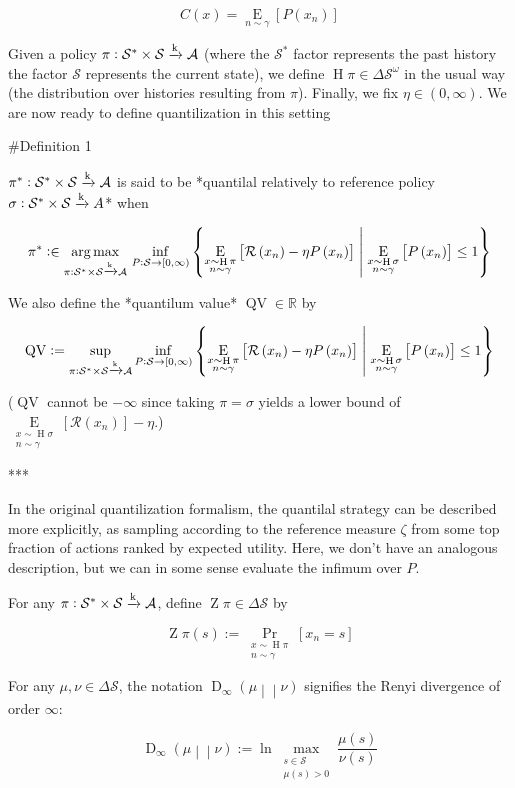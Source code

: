 \documentclass[a4paper]{article}
\newcommand{\AP}[1]{\left(#1\right)}
\newcommand{\AB}[1]{\left[#1\right]}
\newcommand{\ACM}[2]{\left\{#1\;\middle\vert\;#2\right\}}
\newcommand{\Pa}[2]{\underset{#1}{\operatorname{Pr}}\AB{#2}}
\newcommand{\Ea}[2]{\underset{#1}{\operatorname{E}}\AB{#2}}
\newcommand{\RD}[3]{\operatorname{D}_{#1}\AP{#2\middle\vert\middle\vert#3}}
\newcommand{\Argmax}[1]{\underset{#1}{\operatorname{arg\,max}}\,}
\newcommand{\Reals}{\mathbb{R}}
\newcommand{\K}{\xrightarrow{\textnormal{k}}}
\newcommand{\A}{\mathcal{A}}
\newcommand{\St}{\mathcal{S}}
\newcommand{\R}{\mathcal{R}}
\newcommand{\Pe}{P}
\newcommand{\Co}{C}
\newcommand{\QV}{\operatorname{QV}}
\DeclareMathOperator{\Hi}{H}
\DeclareMathOperator{\Z}{Z}
\begin{document}
$$\Co(x) = \Ea{n\sim\gamma}{\Pe\AP{x_n}}$$

Given a policy $\pi: \St^*\times\St \K \A$ (where the $\St^*$ factor represents the past history the factor $\St$ represents the current state), we define $\Hi{\pi} \in \Delta\St^\omega$ in the usual way (the distribution over histories resulting from $\pi$). Finally, we fix $\eta \in (0,\infty)$. We are now ready to define quantilization in this setting

\#Definition 1

$\pi^* : \St^*\times\St \K \A$ is said to be *quantilal relatively to reference policy $\sigma: \St^*\times\St \K A$* when

$$\pi^* :\in \Argmax{\pi: \St^*\times\St \K \A}\inf_{\Pe:\St\rightarrow[0,\infty)}\ACM{\Ea{\substack{x\sim\Hi{\pi}\\n\sim\gamma}}{\R\AP{x_n}-\eta\Pe\AP{x_n}}}{\Ea{\substack{x\sim\Hi{\sigma}\\n\sim\gamma}}{\Pe\AP{x_n}}\leq1}$$

We also define the *quantilum value* $\QV \in \Reals$ by

$$\QV := \sup_{\pi: \St^*\times\St \K \A}\inf_{\Pe:\St\rightarrow[0,\infty)}\ACM{\Ea{\substack{x\sim\Hi{\pi}\\n\sim\gamma}}{\R\AP{x_n}-\eta\Pe\AP{x_n}}}{\Ea{\substack{x\sim\Hi{\sigma}\\n\sim\gamma}}{\Pe\AP{x_n}}\leq1}$$

($\QV$ cannot be $-\infty$ since taking $\pi=\sigma$ yields a lower bound of $\Ea{\substack{x\sim\Hi{\sigma}\\n\sim\gamma}}{\R\AP{x_n}}-\eta$.)

***

In the original quantilization formalism, the quantilal strategy can be described more explicitly, as sampling according to the reference measure $\zeta$ from some top fraction of actions ranked by expected utility. Here, we don't have an analogous description, but we can in some sense evaluate the infimum over $\Pe$.

For any $\pi: \St^*\times\St \K \A$, define $\Z{\pi}\in\Delta\St$ by

$$\Z{\pi}(s):=\Pa{\substack{x\sim\Hi{\pi}\\n\sim\gamma}}{x_n=s}$$

For any $\mu,\nu\in\Delta\St$, the notation $\RD{\infty}{\mu}{\nu}$ signifies the Renyi divergence of order $\infty$:

$$\RD{\infty}{\mu}{\nu} := \ln \max_{\substack{s\in\St \\ \mu(s)> 0}}\frac{\mu(s)}{\nu(s)}$$
\end{document}
